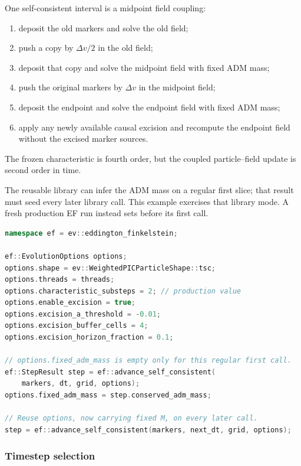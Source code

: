 One self-consistent interval is a midpoint field coupling:
\begin{enumerate}
\item deposit the old markers and solve the old field;
\item push a copy by \(\Delta v/2\) in the old field;
\item deposit that copy and solve the midpoint field with fixed ADM mass;
\item push the original markers by \(\Delta v\) in the midpoint field;
\item deposit the endpoint and solve the endpoint field with fixed ADM mass;
\item apply any newly available causal excision and recompute the endpoint
      field without the excised marker sources.
\end{enumerate}
The frozen characteristic is fourth order, but the coupled particle--field
update is second order in time.

The reusable library can infer the ADM mass on a regular first slice; that
result must seed every later library call.  This example exercises that
library mode.  A fresh production EF run instead sets
 before its first call.
\begin{lstlisting}[language=C++,basicstyle=\ttfamily\scriptsize]
namespace ef = ev::eddington_finkelstein;

ef::EvolutionOptions options;
options.shape = ev::WeightedPICParticleShape::tsc;
options.threads = threads;
options.characteristic_substeps = 2; // production value
options.enable_excision = true;
options.excision_a_threshold = -0.01;
options.excision_buffer_cells = 4;
options.excision_horizon_fraction = 0.1;

// options.fixed_adm_mass is empty only for this regular first call.
ef::StepResult step = ef::advance_self_consistent(
    markers, dt, grid, options);
options.fixed_adm_mass = step.conserved_adm_mass;

// Reuse options, now carrying fixed M, on every later call.
step = ef::advance_self_consistent(markers, next_dt, grid, options);
\end{lstlisting}

\subsubsection{Timestep selection}

